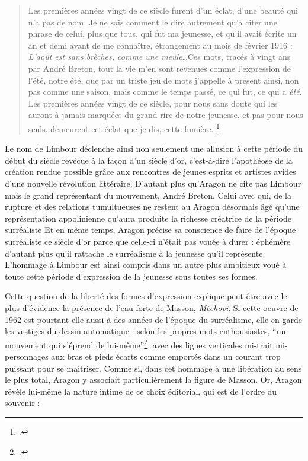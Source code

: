 	\begin{quote}
	Les premières années vingt de ce siècle furent d’un éclat, d’une beauté qui n’a pas de nom. Je ne sais comment le dire autrement qu’à citer une phrase de celui, plus que tous, qui fut ma jeunesse, et qu’il avait écrite un an et demi avant de me connaître, étrangement au mois de février 1916 : \emph{L’août est sans brèches, comme une meule}…Ces mots, tracés à vingt ans par André Breton, tout la vie m’en sont revenues comme l’expression de l’été, notre été, que par un triste jeu de mots j’appelle à présent ainsi, non pas comme une saison, mais comme le temps passé, ce qui fut, ce qui a \emph{été}. Les premières années vingt de ce siècle, pour nous sans doute qui les auront à jamais marquées du grand rire de notre jeunesse, et pas pour nous seuls, demeurent cet éclat que je dis, cette lumière. 	
	\footcite[p3]{journallimbour}\end{quote}

	Le nom de Limbour déclenche ainsi non seulement une allusion à cette période du début du siècle revécue à la façon d’un siècle d’or, c’est-à-dire l’apothéose de la création rendue possible grâce aux rencontres de jeunes esprits et artistes avides d’une nouvelle révolution littéraire. D’autant plus qu’Aragon ne cite pas Limbour mais le grand représentant du mouvement, André Breton. Celui avec qui, de la rupture et des relations tumultueuses ne restent au Aragon désormais âgé qu’une représentation appolinienne qu’aura produite la richesse créatrice de la période surréaliste Et en même temps, Aragon précise sa conscience de faire de l’époque surréaliste ce siècle d’or parce que celle-ci n’était pas vouée à durer : éphémère d’autant plus qu’il rattache le surréalisme à la jeunesse qu’il représente. L’hommage à Limbour est ainsi compris dans un autre plus ambitieux voué à toute cette période d’expression de la jeunesse sous toutes ses formes. 

	Cette question de la liberté des formes d’expression explique peut-être avec le plus d’évidence la présence de l’eau-forte de Masson, \emph{Méchovi}. Si cette oeuvre de 1962 est pourtant elle aussi à des années de l’époque du surréalisme, elle en garde les vestiges du dessin automatique : selon les propres mots enthousiastes, \enquote{un mouvement qui s’éprend de lui-même}\footcite[p21]{rebelle}, avec des lignes verticales mi-trait mi-personnages aux bras et pieds écarts comme emportés dans un courant trop puissant pour se maitriser. Comme si, dans cet hommage à une libération au sens le plus total, Aragon y associait particulièrement la figure de Masson. Or, Aragon révèle lui-même la nature intime de ce choix éditorial, qui est de l’ordre du souvenir :

